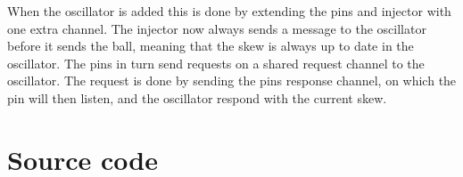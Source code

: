 \documentclass[a4paper, 11pt]{article}
\begin{document}
When the oscillator is added this is done by extending the pins and injector with one extra channel. The injector now always sends a message to the oscillator before it sends the ball, meaning that the skew is always up to date in the oscillator. The pins in turn send requests on a shared request channel to the oscillator. The request is done by sending the pins response channel, on which the pin will then listen, and the oscillator respond with the current skew.


\appendix
\section{Source code} %
\label{sec:source_code}

\inputminted[fontsize=\scriptsize, frame=topline, label=machine.go, linenos=true]{go}{../src/machine.go}

\inputminted[fontsize=\scriptsize, frame=topline, label=main.go, linenos=true]{go}{../src/main.go}

\end{document}
